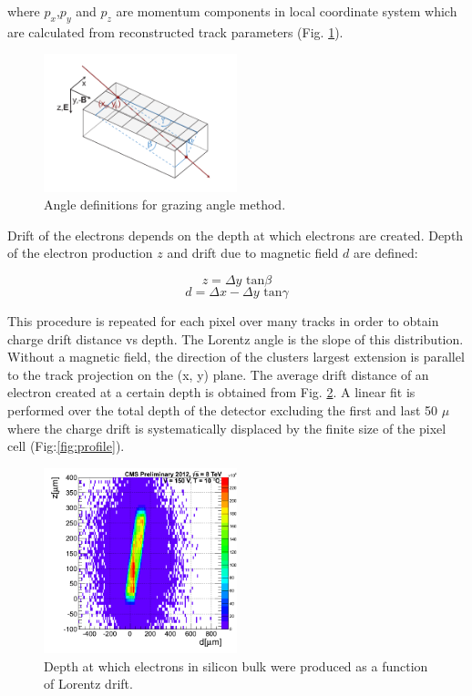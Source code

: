 where $p_x$,$p_y$ and $p_z$ are momentum components in local coordinate system which are calculated from reconstructed track parameters (Fig. \ref{fig:kut}). \\
\begin{figure}[ht!]
\centering
\includegraphics[width=0.5\textwidth]{Figures/kut.png}
\caption{Angle definitions for grazing angle method.}
\label{fig:kut}
\end{figure}
Drift of the electrons depends on the depth at which electrons are created. Depth of the electron production $z$ and drift due to magnetic field $d$ are defined:

\begin{equation}
z = \Delta y \text{ tan}\beta
\end{equation}
\begin{equation}
d=\Delta x-\Delta y \text{ tan}\gamma
\end{equation}

This procedure is repeated for each pixel over many tracks in order to obtain charge drift distance vs depth. The Lorentz angle is the slope of this distribution.  Without a magnetic field, the
direction of the clusters largest extension is parallel to the track projection on the (x, y) plane. The average drift distance of an electron created at a certain depth is obtained from Fig. \ref{fig:2D}. A linear fit is
performed over the total depth of the detector excluding the first and last 50 $\mu$ where the charge drift is systematically displaced by the finite size of the pixel cell (Fig:\ref{fig:profile}). 

\begin{figure}[ht!]
\centering
\includegraphics[width=0.5\textwidth]{Figures/LA2012_2D.png}
\caption{Depth at which electrons in silicon bulk were produced as a function of Lorentz drift.}
\label{fig:2D}
\end{figure}

